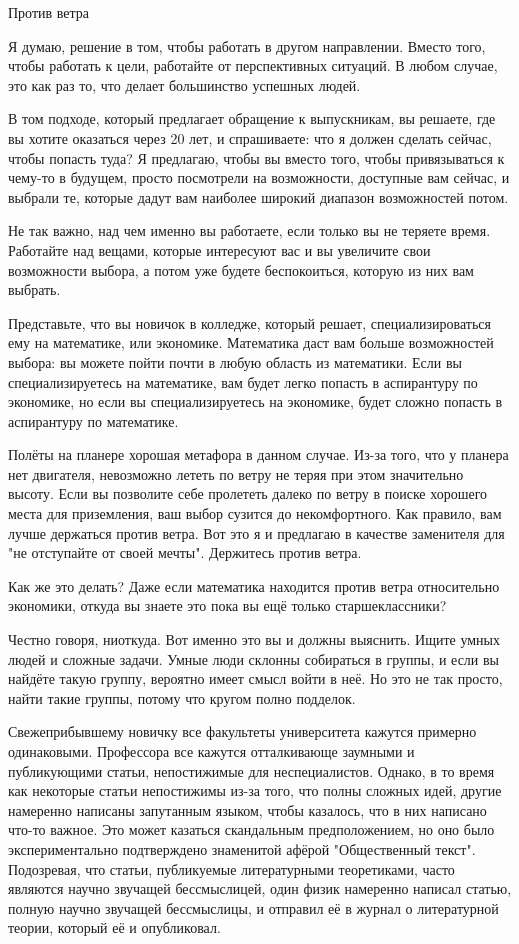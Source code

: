 \documentclass[ebook,12pt,oneside,openany]{memoir}
\begin{document}
Против ветра

Я думаю, решение в том, чтобы работать в другом направлении. Вместо
того, чтобы работать к цели, работайте от перспективных ситуаций. В
любом случае, это как раз то, что делает большинство успешных людей.

В том подходе, который предлагает обращение к выпускникам, вы решаете,
где вы хотите оказаться через 20 лет, и спрашиваете: что я должен
сделать сейчас, чтобы попасть туда? Я предлагаю, чтобы вы вместо того,
чтобы привязываться к чему-то в будущем, просто посмотрели на
возможности, доступные вам сейчас, и выбрали те, которые дадут вам
наиболее широкий диапазон возможностей потом.

Не так важно, над чем именно вы работаете, если только вы не теряете
время. Работайте над вещами, которые интересуют вас и вы увеличите
свои возможности выбора, а потом уже будете беспокоиться, которую из
них вам выбрать.

Представьте, что вы новичок в колледже, который решает,
специализироваться ему на математике, или экономике. Математика даст
вам больше возможностей выбора: вы можете пойти почти в любую область
из математики. Если вы специализируетесь на математике, вам будет
легко попасть в аспирантуру по экономике, но если вы специализируетесь
на экономике, будет сложно попасть в аспирантуру по математике.

Полёты на планере хорошая метафора в данном случае. Из-за того, что у
планера нет двигателя, невозможно лететь по ветру не теряя при этом
значительно высоту. Если вы позволите себе пролететь далеко по ветру в
поиске хорошего места для приземления, ваш выбор сузится до
некомфортного. Как правило, вам лучше держаться против ветра. Вот это
я и предлагаю в качестве заменителя для "не отступайте от своей
мечты". Держитесь против ветра.

Как же это делать? Даже если математика находится против ветра
относительно экономики, откуда вы знаете это пока вы ещё только
старшеклассники?

Честно говоря, ниоткуда. Вот именно это вы и должны выяснить. Ищите
умных людей и сложные задачи. Умные люди склонны собираться в группы,
и если вы найдёте такую группу, вероятно имеет смысл войти в неё. Но
это не так просто, найти такие группы, потому что кругом полно
подделок.

Свежеприбывшему новичку все факультеты университета кажутся примерно
одинаковыми. Профессора все кажутся отталкивающе заумными и
публикующими статьи, непостижимые для неспециалистов. Однако, в то
время как некоторые статьи непостижимы из-за того, что полны сложных
идей, другие намеренно написаны запутанным языком, чтобы казалось, что
в них написано что-то важное. Это может казаться скандальным
предположением, но оно было экспериментально подтверждено знаменитой
афёрой "Общественный текст". Подозревая, что статьи, публикуемые
литературными теоретиками, часто являются научно звучащей
бессмыслицей, один физик намеренно написал статью, полную научно
звучащей бессмыслицы, и отправил её в журнал о литературной теории,
который её и опубликовал.
\end{document}

